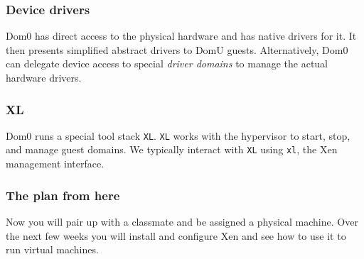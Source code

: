 \documentclass[10pt]{beamer}
\begin{document}
\begin{frame}
  \frametitle{Device drivers}
  
  Dom0 has direct access to the physical hardware and has native drivers for it. It then presents simplified abstract drivers to DomU guests. Alternatively, Dom0 can delegate device access to special \emph{driver domains} to manage the actual hardware drivers. 
  
  \vspace{5mm}
             
\end{frame}

\begin{frame}
  \frametitle{XL}
  
  Dom0 runs a special tool stack \texttt{XL}.  \texttt{XL} works with the hypervisor to start, stop, and manage guest domains. 
  We typically interact with \texttt{XL} using \texttt{xl}, the Xen management interface.         
  
  \end{frame}


\begin{frame}
  \frametitle{The plan from here}
  
  Now you will pair up with a classmate and be assigned a physical machine. Over the next few weeks you will install and configure Xen and see 
  how to use it to run virtual machines.
  
\end{frame}
\end{document}
